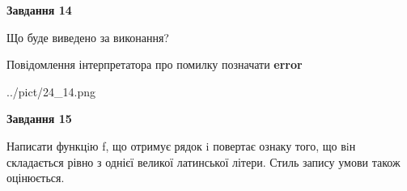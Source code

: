 \documentclass[11pt, ukrainian]{article}
\begin{document}
{\begin {large}
{\begin {center}\textbf{Завдання 14}\end {center}}\par
Що буде виведено за виконання? \par
Повідомлення інтерпретатора про помилку позначати \textbf{error}

\begin{center}
	{../pict/24_14.png}
\end{center}
\newpage

{\begin {center}\textbf{Завдання 15}\end {center}}\par

Написати функцiю f, що отримує рядок i повертає ознаку того, що вiн складається рівно з однієї великої латинської літери. Стиль запису умови також оцінюється.\par
\newpage

\end {large}}
\end{document}
